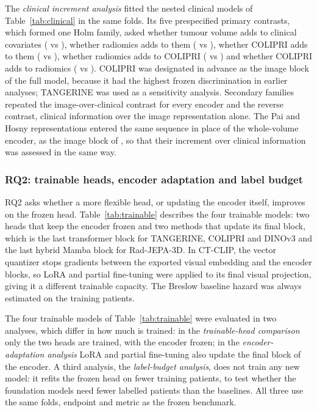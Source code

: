 The \emph{clinical increment analysis} fitted the nested clinical models of Table~\ref{tab:clinical} in the same folds. Its five prespecified primary contrasts, which formed one Holm family, asked whether tumour volume adds to clinical covariates ( vs ), whether radiomics adds to them ( vs ), whether COLIPRI adds to them ( vs ), whether radiomics adds to COLIPRI ( vs ) and whether COLIPRI adds to radiomics ( vs ). COLIPRI was designated in advance as the image block of the full model, because it had the highest frozen discrimination in earlier analyses; TANGERINE was used as a sensitivity analysis. Secondary families repeated the image-over-clinical contrast for every encoder and the reverse contrast, clinical information over the image representation alone. The Pai and Hosny representations entered the same sequence in place of the whole-volume encoder, as the image block of , so that their increment over clinical information was assessed in the same way.

\subsubsection{RQ2: trainable heads, encoder adaptation and label budget}\label{sec:selected}
RQ2 asks whether a more flexible head, or updating the encoder itself, improves on the frozen head. Table~\ref{tab:trainable} describes the four trainable models: two heads that keep the encoder frozen and two methods that update its final block, which is the last transformer block for TANGERINE, COLIPRI and DINOv3 and the last hybrid Mamba block for Rad-JEPA-3D. In CT-CLIP, the vector quantizer stops gradients between the exported visual embedding and the encoder blocks, so LoRA and partial fine-tuning were applied to its final visual projection, giving it a different trainable capacity. The Breslow baseline hazard was always estimated on the training patients.

\tabTrainable

The four trainable models of Table~\ref{tab:trainable} were evaluated in two analyses, which differ in how much is trained: in the \emph{trainable-head comparison} only the two heads are trained, with the encoder frozen; in the \emph{encoder-adaptation analysis} LoRA and partial fine-tuning also update the final block of the encoder. A third analysis, the \emph{label-budget analysis}, does not train any new model: it refits the frozen head on fewer training patients, to test whether the foundation models need fewer labelled patients than the baselines. All three use the same folds, endpoint and metric as the frozen benchmark.

